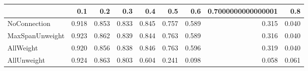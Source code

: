 \begin{tabular}{lrrrrrrrr}
\toprule
{} &   0.1 &   0.2 &   0.3 &   0.4 &   0.5 &   0.6 & 0.7000000000000001 &   0.8 \\
\midrule
NoConnection    & 0.918 & 0.853 & 0.833 & 0.845 & 0.757 & 0.589 &              0.315 & 0.040 \\
MaxSpanUnweight & 0.923 & 0.862 & 0.839 & 0.844 & 0.763 & 0.589 &              0.316 & 0.040 \\
AllWeight       & 0.920 & 0.856 & 0.838 & 0.846 & 0.763 & 0.596 &              0.319 & 0.040 \\
AllUnweight     & 0.924 & 0.863 & 0.803 & 0.604 & 0.241 & 0.098 &              0.058 & 0.061 \\
\bottomrule
\end{tabular}

